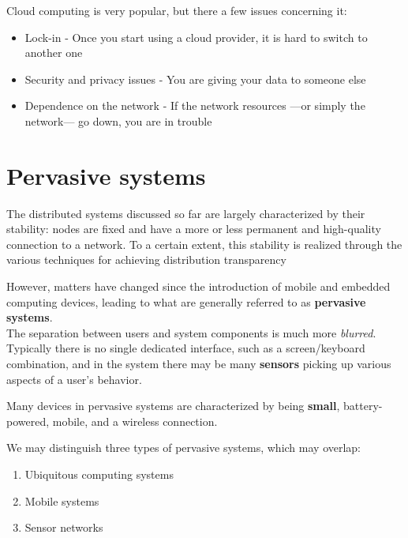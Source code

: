 
{Cloud computing is very popular, but there a few issues concerning it:\ns
\begin{itemize}
   \item Lock-in - Once you start using a cloud provider, it is hard to switch to another one
   \item Security and privacy issues - You are giving your data to someone else
   \item Dependence on the network - If the network resources ---or simply the network--- go down, you are in trouble
\end{itemize}}

\section{Pervasive systems}

The distributed systems discussed so far are largely characterized by their stability:
nodes are fixed and have a more or less permanent and high-quality connection to a network.
To a certain extent, this stability is realized through the various techniques for achieving distribution transparency

However, matters have changed since the introduction of mobile and embedded computing devices, leading to what are generally referred to as \textbf{pervasive systems}.\\
The separation between users and system components is much more \textit{blurred}.
Typically there is no single dedicated interface, such as a screen/keyboard combination, and in the system there may be many \textbf{sensors} picking up various aspects of a user's behavior.

Many devices in pervasive systems are characterized by being \textbf{small}, battery-powered, mobile, and a wireless connection.

We may distinguish three types of pervasive systems, which may overlap:
\begin{enumerate}
   \item Ubiquitous computing systems
   \item Mobile systems
   \item Sensor networks
\end{enumerate}